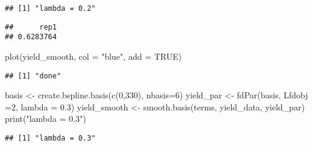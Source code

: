 \documentclass[
]{article}
\newenvironment{Shaded}{\begin{snugshade}}{\end{snugshade}}
\newcommand{\AttributeTok}[1]{\textcolor[rgb]{0.77,0.63,0.00}{#1}}
\newcommand{\ConstantTok}[1]{\textcolor[rgb]{0.00,0.00,0.00}{#1}}
\newcommand{\DecValTok}[1]{\textcolor[rgb]{0.00,0.00,0.81}{#1}}
\newcommand{\FloatTok}[1]{\textcolor[rgb]{0.00,0.00,0.81}{#1}}
\newcommand{\FunctionTok}[1]{\textcolor[rgb]{0.00,0.00,0.00}{#1}}
\newcommand{\NormalTok}[1]{#1}
\newcommand{\OtherTok}[1]{\textcolor[rgb]{0.56,0.35,0.01}{#1}}
\newcommand{\SpecialCharTok}[1]{\textcolor[rgb]{0.00,0.00,0.00}{#1}}
\newcommand{\StringTok}[1]{\textcolor[rgb]{0.31,0.60,0.02}{#1}}
\begin{document}
\begin{verbatim}
## [1] "lambda = 0.2"
\end{verbatim}

\begin{Shaded}
\end{Shaded}

\begin{verbatim}
##      rep1 
## 0.6283764
\end{verbatim}

\begin{Shaded}
\begin{Highlighting}[]
\FunctionTok{plot}\NormalTok{(yield\_smooth, }\AttributeTok{col =} \StringTok{"blue"}\NormalTok{, }\AttributeTok{add =} \ConstantTok{TRUE}\NormalTok{)}
\end{Highlighting}
\end{Shaded}

\begin{verbatim}
## [1] "done"
\end{verbatim}

\begin{Shaded}
\begin{Highlighting}[]
\NormalTok{basis }\OtherTok{\textless{}{-}} \FunctionTok{create.bspline.basis}\NormalTok{(}\FunctionTok{c}\NormalTok{(}\DecValTok{0}\NormalTok{,}\DecValTok{330}\NormalTok{), }\AttributeTok{nbasis=}\DecValTok{6}\NormalTok{)}
\NormalTok{yield\_par }\OtherTok{\textless{}{-}} \FunctionTok{fdPar}\NormalTok{(basis, }\AttributeTok{Lfdobj =}\DecValTok{2}\NormalTok{, }\AttributeTok{lambda =} \FloatTok{0.3}\NormalTok{)}
\NormalTok{yield\_smooth }\OtherTok{\textless{}{-}} \FunctionTok{smooth.basis}\NormalTok{(terms, yield\_data, yield\_par)}
\FunctionTok{print}\NormalTok{(}\StringTok{"lambda = 0.3"}\NormalTok{)}
\end{Highlighting}
\end{Shaded}

\begin{verbatim}
## [1] "lambda = 0.3"
\end{verbatim}

\begin{Shaded}
\end{Shaded}
\end{document}

